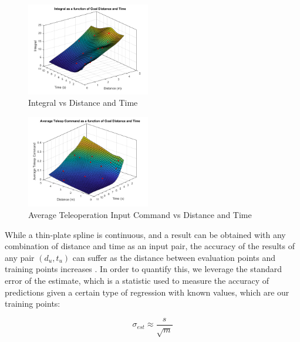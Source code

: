\documentclass[letterpaper, 10 pt, conference]{ieeeconf}  %
\begin{document}
\begin{figure}[ht]
    \includegraphics[width=0.48\textwidth]{images/integs.png}
    \caption{Integral vs Distance and Time}
    \label{fig:integs}
\end{figure}
\begin{figure}[ht]
    \includegraphics[width=0.48\textwidth]{images/joycmds.png}
    \caption{Average Teleoperation Input Command vs Distance and Time}
    \label{fig:joys}
\end{figure}

While a thin-plate spline is continuous, and a result can be obtained with any combination of distance and time as an input pair, the accuracy of the results of any pair $(d_u,t_u)$ can suffer as the distance between evaluation points and training points increases \cite{regress}. In order to quantify this, we leverage the standard error of the estimate, which is a statistic used to measure the accuracy of predictions given a certain type of regression \cite{stdereg} with known values, which are our training points:

\begin{equation} \label{eq:stderr}
    \sigma_{est} \approx \frac{s}{\sqrt{m}}
\end{equation}
\end{document}
